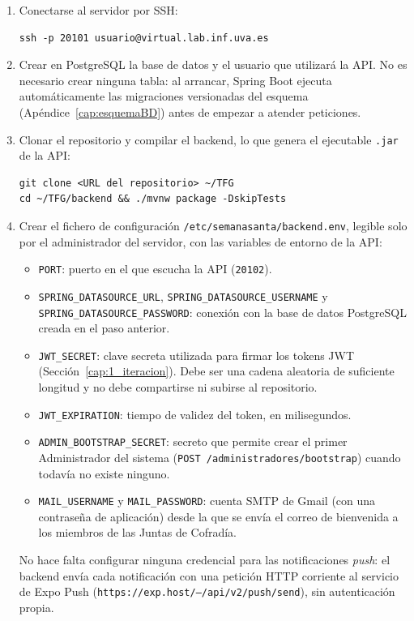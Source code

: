 \begin{enumerate}
    \item Conectarse al servidor por SSH:
    \begin{verbatim}
ssh -p 20101 usuario@virtual.lab.inf.uva.es
    \end{verbatim}
    \item Crear en PostgreSQL la base de datos y el usuario que utilizará la API. No es necesario crear ninguna tabla: al arrancar, Spring Boot ejecuta automáticamente las migraciones versionadas del esquema (Apéndice~\ref{cap:esquemaBD}) antes de empezar a atender peticiones.
    \item Clonar el repositorio y compilar el backend, lo que genera el ejecutable \texttt{.jar} de la API:
    \begin{verbatim}
git clone <URL del repositorio> ~/TFG
cd ~/TFG/backend && ./mvnw package -DskipTests
    \end{verbatim}
    \item Crear el fichero de configuración \texttt{/etc/semanasanta/backend.env}, legible solo por el administrador del servidor, con las variables de entorno de la API:
    \begin{itemize}
        \item \texttt{PORT}: puerto en el que escucha la API (\texttt{20102}).
        \item \texttt{SPRING\_DATASOURCE\_URL}, \texttt{SPRING\_DATASOURCE\_USERNAME} y \texttt{SPRING\_DATASOURCE\_PASSWORD}: conexión con la base de datos PostgreSQL creada en el paso anterior.
        \item \texttt{JWT\_SECRET}: clave secreta utilizada para firmar los tokens JWT (Sección~\ref{cap:1_iteracion}). Debe ser una cadena aleatoria de suficiente longitud y no debe compartirse ni subirse al repositorio.
        \item \texttt{JWT\_EXPIRATION}: tiempo de validez del token, en milisegundos.
        \item \texttt{ADMIN\_BOOTSTRAP\_SECRET}: secreto que permite crear el primer Administrador del sistema (\texttt{POST /administradores/bootstrap}) cuando todavía no existe ninguno.
        \item \texttt{MAIL\_USERNAME} y \texttt{MAIL\_PASSWORD}: cuenta SMTP de Gmail (con una contraseña de aplicación) desde la que se envía el correo de bienvenida a los miembros de las Juntas de Cofradía.
    \end{itemize}
    No hace falta configurar ninguna credencial para las notificaciones \emph{push}: el backend envía cada notificación con una petición HTTP corriente al servicio de Expo Push (\texttt{https://exp.host/--/api/v2/push/send}), sin autenticación propia.

\end{enumerate}
